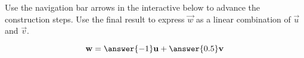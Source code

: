 \documentclass{ximera}
\author{}
\begin{document}
\begin{exercise}
Use the navigation bar arrows in the interactive below to advance the construction steps.  Use the final result to express $\vec{w}$ as a linear combination of $\vec{u}$ and $\vec{v}$.

 
\begin{onlineOnly}
\begin{center}
\end{center}
\end{onlineOnly}

$$\vec{w}=\answer{-1}\vec{u}+\answer{0.5}\vec{v}$$
\end{exercise}
\end{document}
